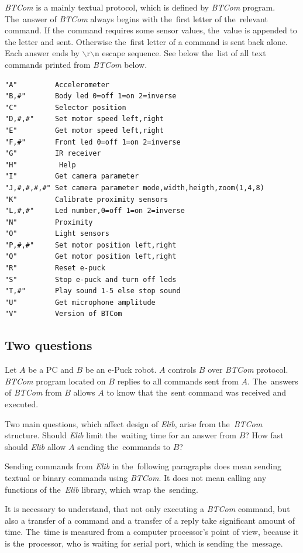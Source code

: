   {\it BTCom} is a mainly textual protocol, which is defined by {\it BTCom} program. The~answer of {\it BTCom} always begins 
  with the~first letter of the~relevant command.
  If the~command requires some sensor values, the~value is appended to the letter and
  sent. Otherwise the~first letter of a command is sent back alone. Each answer ends by 
  $\backslash$r$\backslash$n escape sequence.
  See below the~list of all text commands printed from {\it BTCom} below.
  \lstset{basicstyle=\small}
\begin{lstlisting}
"A"         Accelerometer
"B,#"       Body led 0=off 1=on 2=inverse
"C"         Selector position
"D,#,#"     Set motor speed left,right
"E"         Get motor speed left,right
"F,#"       Front led 0=off 1=on 2=inverse
"G"         IR receiver
"H"          Help
"I"         Get camera parameter
"J,#,#,#,#" Set camera parameter mode,width,heigth,zoom(1,4,8)
"K"         Calibrate proximity sensors
"L,#,#"     Led number,0=off 1=on 2=inverse
"N"         Proximity
"O"         Light sensors
"P,#,#"     Set motor position left,right
"Q"         Get motor position left,right
"R"         Reset e-puck
"S"         Stop e-puck and turn off leds
"T,#"       Play sound 1-5 else stop sound
"U"         Get microphone amplitude
"V"         Version of BTCom
\end{lstlisting}
    
  \subsection*{Two questions} %
  Let $A$ be a PC and $B$ be an e-Puck robot. $A$ controls $B$ over {\it BTCom} protocol. {\it BTCom} program located on $B$ 
  replies to all commands sent from $A$.
  The~answers of {\it BTCom} from $B$ allows $A$ to know that the~sent command was received and
  executed. 
   
  Two main questions, which affect design of {\it Elib}, arise from the~{\it BTCom} structure.
  Should {\it Elib} limit the~waiting time for an answer from $B$?
  How fast should {\it Elib} allow $A$ sending the~commands to $B$?
  \begin{remark}
  Sending commands from {\it Elib} in the~following paragraphs does mean 
  sending textual or binary commands
  using {\it BTCom}. It does not mean calling any functions of the~{\it Elib} library, which wrap the~sending. 
  \end{remark}
   
  It is necessary to understand, that not only executing a {\it BTCom} command, 
  but also a transfer of a command and a transfer of a reply take significant amount of time. 
  The~time is measured from a computer processor's point of view, because
  it is the~processor, who is waiting for serial port, which is sending the~message.
   
